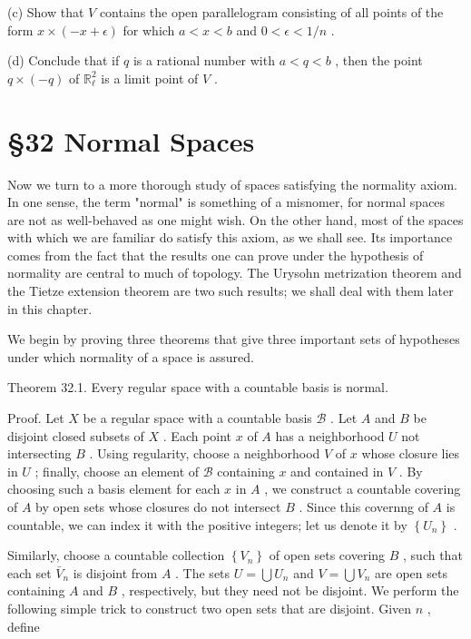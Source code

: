 \documentclass[10pt]{article}
\begin{document}
(c) Show that \(V\) contains the open parallelogram consisting of all points of the form \(x \times  \left( {-x + \epsilon }\right)\) for which \(a < x < b\) and \(0 < \epsilon  < 1/n\) .

(d) Conclude that if \(q\) is a rational number with \(a < q < b\) , then the point \(q \times  \left( {-q}\right)\) of \({\mathbb{R}}_{\ell }^{2}\) is a limit point of \(V\) .

\section*{§32 Normal Spaces}

Now we turn to a more thorough study of spaces satisfying the normality axiom. In one sense, the term "normal" is something of a misnomer, for normal spaces are not as well-behaved as one might wish. On the other hand, most of the spaces with which we are familiar do satisfy this axiom, as we shall see. Its importance comes from the fact that the results one can prove under the hypothesis of normality are central to much of topology. The Urysohn metrization theorem and the Tietze extension theorem are two such results; we shall deal with them later in this chapter.

We begin by proving three theorems that give three important sets of hypotheses under which normality of a space is assured.

Theorem 32.1. Every regular space with a countable basis is normal.

Proof. Let \(X\) be a regular space with a countable basis \(\mathcal{B}\) . Let \(A\) and \(B\) be disjoint closed subsets of \(X\) . Each point \(x\) of \(A\) has a neighborhood \(U\) not intersecting \(B\) . Using regularity, choose a neighborhood \(V\) of \(x\) whose closure lies in \(U\) ; finally, choose an element of \(\mathcal{B}\) containing \(x\) and contained in \(V\) . By choosing such a basis element for each \(x\) in \(A\) , we construct a countable covering of \(A\) by open sets whose closures do not intersect \(B\) . Since this covernng of \(A\) is countable, we can index it with the positive integers; let us denote it by \(\left\{  {U}_{n}\right\}\) .

Similarly, choose a countable collection \(\left\{  {V}_{n}\right\}\) of open sets covering \(B\) , such that each set \({\bar{V}}_{n}\) is disjoint from \(A\) . The sets \(U = \bigcup {U}_{n}\) and \(V = \bigcup {V}_{n}\) are open sets containing \(A\) and \(B\) , respectively, but they need not be disjoint. We perform the following simple trick to construct two open sets that are disjoint. Given \(n\) , define
\end{document}
